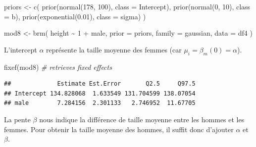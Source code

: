 \documentclass[
  a4paper,11pt,twoside,onecolumn,openright,final,oldfontcommands]{memoir}
\newenvironment{Shaded}{\begin{snugshade}}{\end{snugshade}}
\newcommand{\AttributeTok}[1]{\textcolor[rgb]{0.77,0.63,0.00}{#1}}
\newcommand{\CommentTok}[1]{\textcolor[rgb]{0.56,0.35,0.01}{\textit{#1}}}
\newcommand{\DecValTok}[1]{\textcolor[rgb]{0.00,0.00,0.81}{#1}}
\newcommand{\FloatTok}[1]{\textcolor[rgb]{0.00,0.00,0.81}{#1}}
\newcommand{\FunctionTok}[1]{\textcolor[rgb]{0.00,0.00,0.00}{#1}}
\newcommand{\NormalTok}[1]{#1}
\newcommand{\OtherTok}[1]{\textcolor[rgb]{0.56,0.35,0.01}{#1}}
\newcommand{\SpecialCharTok}[1]{\textcolor[rgb]{0.00,0.00,0.00}{#1}}
\theoremstyle{definition}
\theoremstyle{definition}
\theoremstyle{definition}
\theoremstyle{definition}
\theoremstyle{remark}
\begin{document}
\begin{Shaded}
\begin{Highlighting}[]
\NormalTok{priors }\OtherTok{\textless{}{-}} \FunctionTok{c}\NormalTok{(}
  \FunctionTok{prior}\NormalTok{(}\FunctionTok{normal}\NormalTok{(}\DecValTok{178}\NormalTok{, }\DecValTok{100}\NormalTok{), }\AttributeTok{class =}\NormalTok{ Intercept),}
  \FunctionTok{prior}\NormalTok{(}\FunctionTok{normal}\NormalTok{(}\DecValTok{0}\NormalTok{, }\DecValTok{10}\NormalTok{), }\AttributeTok{class =}\NormalTok{ b),}
  \FunctionTok{prior}\NormalTok{(}\FunctionTok{exponential}\NormalTok{(}\FloatTok{0.01}\NormalTok{), }\AttributeTok{class =}\NormalTok{ sigma)}
\NormalTok{  )}

\NormalTok{mod8 }\OtherTok{\textless{}{-}} \FunctionTok{brm}\NormalTok{(}
\NormalTok{  height }\SpecialCharTok{\textasciitilde{}} \DecValTok{1} \SpecialCharTok{+}\NormalTok{ male,}
  \AttributeTok{prior =}\NormalTok{ priors,}
  \AttributeTok{family =}\NormalTok{ gaussian,}
  \AttributeTok{data =}\NormalTok{ df4}
\NormalTok{  )}
\end{Highlighting}
\end{Shaded}

L'intercept \(\alpha\) représente la taille moyenne des femmes (car \(\mu_{i} = \beta_{m}(0) = \alpha\)).

\begin{Shaded}
\begin{Highlighting}[]
\FunctionTok{fixef}\NormalTok{(mod8) }\CommentTok{\# retrieves fixed effects}
\end{Highlighting}
\end{Shaded}

\begin{verbatim}
##             Estimate Est.Error       Q2.5     Q97.5
## Intercept 134.828068  1.633549 131.704599 138.07054
## male        7.284156  2.301133   2.746952  11.67705
\end{verbatim}

La pente \(\beta\) nous indique la différence de taille moyenne entre les hommes et les femmes. Pour obtenir la taille moyenne des hommes, il suffit donc d'ajouter \(\alpha\) et \(\beta\).

\begin{Shaded}
\end{Shaded}
\end{document}
